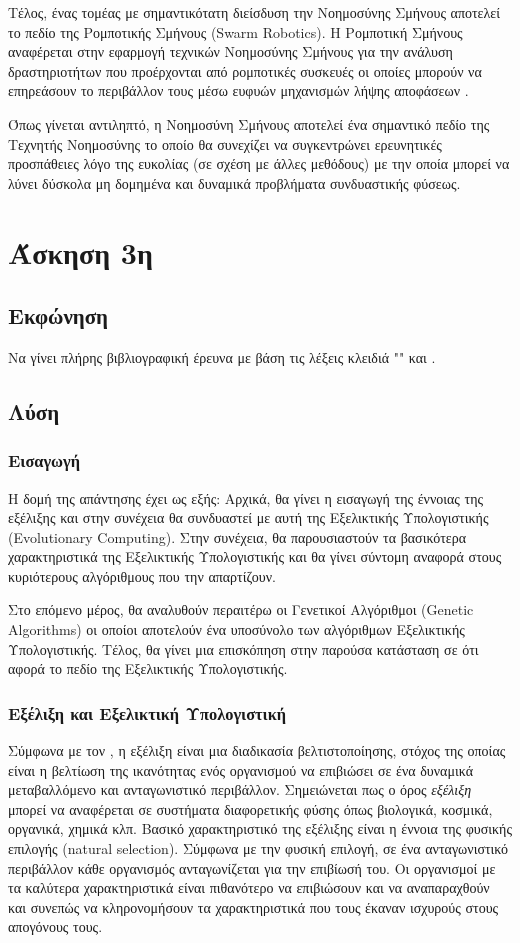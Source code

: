 \documentclass{assignment}
\begin{document}
Τέλος, ένας τομέας με σημαντικότατη διείσδυση την Νοημοσύνης Σμήνους αποτελεί
το πεδίο της Ρομποτικής Σμήνους (Swarm Robotics). Η Ρομποτική Σμήνους αναφέρεται
στην εφαρμογή τεχνικών Νοημοσύνης Σμήνους για την ανάλυση δραστηριοτήτων που
προέρχονται από ρομποτικές συσκευές οι οποίες μπορούν να επηρεάσουν το
περιβάλλον τους μέσω ευφυών μηχανισμών λήψης αποφάσεων \cite{jevtic2007swarm}.

Όπως γίνεται αντιληπτό, η Νοημοσύνη Σμήνους αποτελεί ένα σημαντικό πεδίο της
Τεχνητής Νοημοσύνης το οποίο θα συνεχίζει να συγκεντρώνει ερευνητικές
προσπάθειες λόγο της ευκολίας (σε σχέση με άλλες μεθόδους) με την οποία μπορεί
να λύνει δύσκολα μη δομημένα και δυναμικά προβλήματα συνδυαστικής φύσεως.
\section{Άσκηση 3η}
\subsection{Εκφώνηση}

Να γίνει πλήρης βιβλιογραφική έρευνα με βάση τις λέξεις κλειδιά "" και .

\subsection {Λύση}
\subsubsection{Εισαγωγή}
Η δομή της απάντησης έχει ως εξής: Αρχικά, θα γίνει η εισαγωγή της έννοιας
της εξέλιξης και στην συνέχεια θα συνδυαστεί με αυτή της Εξελικτικής
Υπολογιστικής (Evolutionary Computing). Στην συνέχεια, θα παρουσιαστούν τα
βασικότερα χαρακτηριστικά της Εξελικτικής Υπολογιστικής και θα γίνει
σύντομη αναφορά στους κυριότερους αλγόριθμους που την απαρτίζουν.

Στο επόμενο μέρος, θα αναλυθούν περαιτέρω οι Γενετικοί Αλγόριθμοι (Genetic Algorithms) οι οποίοι αποτελούν ένα υποσύνολο των αλγόριθμων Εξελικτικής
Υπολογιστικής. Τέλος, θα γίνει μια επισκόπηση στην παρούσα κατάσταση σε ότι
αφορά το πεδίο της Εξελικτικής Υπολογιστικής.
\subsubsection{Εξέλιξη και Εξελικτική Υπολογιστική}
Σύμφωνα με τον \citet{darwin1859origins}, η εξέλιξη είναι μια διαδικασία
βελτιστοποίησης, στόχος της οποίας είναι η βελτίωση της ικανότητας ενός
οργανισμού να επιβιώσει σε ένα δυναμικά μεταβαλλόμενο και ανταγωνιστικό
περιβάλλον. Σημειώνεται πως ο όρος \emph{εξέλιξη} μπορεί να αναφέρεται σε
συστήματα διαφορετικής φύσης όπως βιολογικά, κοσμικά, οργανικά, χημικά κλπ. 
Βασικό χαρακτηριστικό της εξέλιξης είναι η έννοια της φυσικής επιλογής
(natural selection). Σύμφωνα με την φυσική επιλογή, σε ένα ανταγωνιστικό
περιβάλλον κάθε οργανισμός ανταγωνίζεται για την επιβίωσή του. Οι οργανισμοί
με τα καλύτερα χαρακτηριστικά είναι πιθανότερο να επιβιώσουν και να αναπαραχθούν
και συνεπώς να κληρονομήσουν τα χαρακτηριστικά που τους έκαναν ισχυρούς στους
απογόνους τους.
\end{document}
